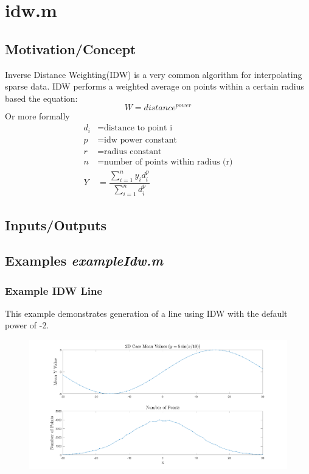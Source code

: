 \documentclass{article}
\begin{document}
\section{idw.m}


\subsection{Motivation/Concept}
Inverse Distance Weighting(IDW) is a very common algorithm for interpolating sparse data.  IDW performs a weighted average on points within a certain radius based the equation:
\[
W = distance ^ {power}
\]
Or more formally
\begin{align*}
d_i &= \text{distance to point i} \\
p &= \text{idw power constant} \\
r &= \text{radius constant} \\
n &= \text{number of points within radius (r)} \\
Y &= \dfrac{\sum\limits_{i=1}^{n} y_id_i^p}{\sum\limits_{i=1}^{n} d_i^p}
\end{align*}

\subsection{Inputs/Outputs}


\clearpage
\subsection{Examples \textit{exampleIdw.m}}
\subsubsection*{Example IDW Line}
This example demonstrates generation of a line using IDW with the default power of -2.


\begin{figure}[H]
	\centering
	\includegraphics[width = \linewidth]{1d}
\end{figure}
\clearpage
\end{document}
